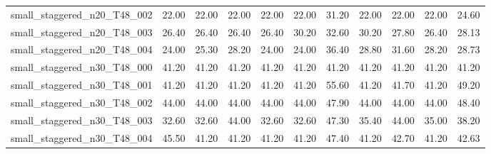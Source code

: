 \begin{table}[htbp]
\begin{tabular}{lrrrrrrrrrr}
small\_staggered\_n20\_T48\_002 & 22.00 & 22.00 & 22.00 & 22.00 & 22.00 & 31.20 & 22.00 & 22.00 & 22.00 & 24.60 \\
small\_staggered\_n20\_T48\_003 & 26.40 & 26.40 & 26.40 & 26.40 & 30.20 & 32.60 & 30.20 & 27.80 & 26.40 & 28.13 \\
small\_staggered\_n20\_T48\_004 & 24.00 & 25.30 & 28.20 & 24.00 & 24.00 & 36.40 & 28.80 & 31.60 & 28.20 & 28.73 \\
small\_staggered\_n30\_T48\_000 & 41.20 & 41.20 & 41.20 & 41.20 & 41.20 & 41.20 & 41.20 & 41.20 & 41.20 & 41.20 \\
small\_staggered\_n30\_T48\_001 & 41.20 & 41.20 & 41.20 & 41.20 & 41.20 & 55.60 & 41.20 & 41.70 & 41.20 & 49.20 \\
small\_staggered\_n30\_T48\_002 & 44.00 & 44.00 & 44.00 & 44.00 & 44.00 & 47.90 & 44.00 & 44.00 & 44.00 & 48.40 \\
small\_staggered\_n30\_T48\_003 & 32.60 & 32.60 & 44.00 & 32.60 & 32.60 & 47.30 & 35.40 & 44.00 & 35.00 & 38.20 \\
small\_staggered\_n30\_T48\_004 & 45.50 & 41.20 & 41.20 & 41.20 & 41.20 & 47.40 & 41.20 & 42.70 & 41.20 & 42.63 \\
\bottomrule
\end{tabular}
\end{table}
